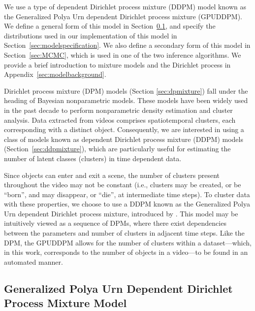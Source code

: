 \documentclass{article}
\begin{document}
We use a type of dependent Dirichlet process mixture (DDPM) model known as the Generalized Polya Urn dependent Dirichlet process mixture (GPUDDPM). We define a general form of this model in Section~\ref{sec:gpuddpm}, and specify the distributions used in our implementation of this model in Section~\ref{sec:modelspecification}. We also define a secondary form of this model in Section~\ref{sec:MCMC}, which is used in one of the two inference algorithms. We provide a brief introduction to mixture models and the Dirichlet process in Appendix~\ref{sec:modelbackground}.

Dirichlet process mixture (DPM) models (Section \ref{sec:dpmixture}) fall under the heading of Bayesian nonparametric models. These models have been widely used in the past decade to perform nonparametric density estimation and cluster analysis. Data extracted from videos comprises spatiotemporal clusters, each corresponding with a distinct object. Consequently, we are interested in using a class of models known as dependent Dirichlet process mixture (DDPM) models (Section~\ref{sec:ddpmixture}), which are particularly useful for estimating the number of latent classes (clusters) in time dependent data. 

Since objects can enter and exit a scene, the number of clusters present throughout the video may not be constant (i.e., clusters may be created, or be ``born'', and may disappear, or ``die'', at intermediate time steps). To cluster data with these properties, we choose to use a DDPM known as the Generalized Polya Urn dependent Dirichlet process mixture, introduced by \cite{caron_2007}. This model may be intuitively viewed as a sequence of DPMs, where there exist dependencies between the parameters and number of clusters in adjacent time steps. Like the DPM, the GPUDDPM allows for the number of clusters within a dataset---which, in this work, corresponds to the number of objects in a video---to be found in an automated manner.



\subsection{Generalized Polya Urn Dependent Dirichlet Process Mixture Model}
\label{sec:gpuddpm}
\end{document}
